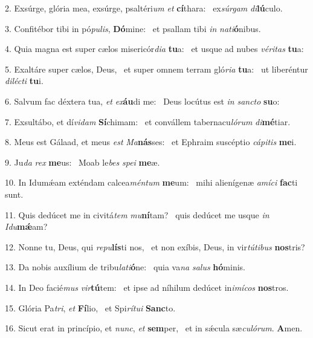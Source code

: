 2. Exsúrge, glória mea, exsúrge, psaltéri\textit{um} \textit{et} \textbf{cí}thara: \ast\  ex\textit{súr}\textit{gam} \textit{di}\textbf{lú}culo.\

3. Confitébor tibi in pó\textit{pu}\textit{lis}, \textbf{Dó}mine: \ast\  et psallam tibi \textit{in} \textit{na}\textit{ti}\textbf{ó}nibus.\

4. Quia magna est super cælos misericór\textit{di}\textit{a} \textbf{tu}a: \ast\  et usque ad nubes \textit{vé}\textit{ri}\textit{tas} \textbf{tu}a:\

5. Exaltáre super cælos, Deus, \dag\  et super omnem terram gló\textit{ri}\textit{a} \textbf{tu}a: \ast\  ut liberéntur \textit{di}\textit{léc}\textit{ti} \textbf{tu}i.\

6. Salvum fac déxtera tua, \textit{et} \textit{ex}\textbf{áu}di me: \ast\  Deus locútus est \textit{in} \textit{sanc}\textit{to} \textbf{su}o:\

7. Exsultábo, et dí\textit{vi}\textit{dam} \textbf{Sí}chimam: \ast\  et convállem tabernacu\textit{ló}\textit{rum} \textit{di}\textbf{mé}tiar.\

8. Meus est Gálaad, et meus \textit{est} \textit{Ma}\textbf{nás}ses: \ast\  et Ephraim suscéptio \textit{cá}\textit{pi}\textit{tis} \textbf{me}i.\

9. Ju\textit{da} \textit{rex} \textbf{me}us: \ast\  Moab le\textit{bes} \textit{spe}\textit{i} \textbf{me}æ.\

10. In Idumǽam exténdam calcea\textit{mén}\textit{tum} \textbf{me}um: \ast\  mihi alienígenæ \textit{a}\textit{mí}\textit{ci} \textbf{fac}ti sunt.\

11. Quis dedúcet me in civitá\textit{tem} \textit{mu}\textbf{ní}tam? \ast\  quis dedúcet me usque \textit{in} \textit{I}\textit{du}\textbf{mǽ}am?\

12. Nonne tu, Deus, qui \textit{re}\textit{pu}\textbf{lís}ti nos, \ast\  et non exíbis, Deus, in vir\textit{tú}\textit{ti}\textit{bus} \textbf{nos}tris?\

13. Da nobis auxílium de tribu\textit{la}\textit{ti}\textbf{ó}ne: \ast\  quia va\textit{na} \textit{sa}\textit{lus} \textbf{hó}minis.\

14. In Deo facié\textit{mus} \textit{vir}\textbf{tú}tem: \ast\  et ipse ad níhilum dedúcet in\textit{i}\textit{mí}\textit{cos} \textbf{nos}tros.\

15. Glória Pa\textit{tri}, \textit{et} \textbf{Fí}lio, \ast\  et Spi\textit{rí}\textit{tu}\textit{i} \textbf{Sanc}to.\

16. Sicut erat in princípio, et \textit{nunc}, \textit{et} \textbf{sem}per, \ast\  et in sǽcula sæ\textit{cu}\textit{ló}\textit{rum}. \textbf{A}men.\


